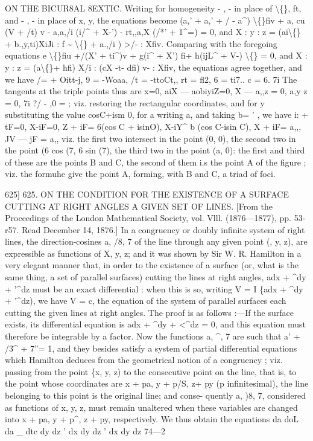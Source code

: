 \documentclass[11pt,a4paper]{book}
\begin{document}
ON THE BICUR8AL 8EXTIC.
Writing
for
homogeneity -
,
-
in
place
of
\textbackslash\{\},
ft,
and
-
,
-
in
place
of
x,
y,
the
equations become
(a,' + a,' + \guillemotleft{}/ - a\textasciicircum{}) \textbackslash\{\}fiv + a, cu (V + /t\guillemotright{}) v - a,a,/i (i/\textasciicircum{} + X-') - rt,,a,X (/*' +
1\textasciicircum{}=) = 0,
and
X
: y
: z = (ai\textbackslash\{\} + b.,y,ti)XiJi
:
f \textasciitilde{} \textbackslash\{\} + a.,/i
)
>/-
:
Xfiv.
Comparing with the foregoing equations
e \textbackslash\{\}fiu +/(X' + ti\textasciicircum{})v + g(i\textasciicircum{} + X') fi+ h(ijL\textasciicircum{} + V-) \textbackslash\{\} = 0,
and
X
: y
: z = (a\textbackslash\{\}+ hfi) X/i
: (cX
-t- dfi) v-
:
Xfiv,
the equations agree together, and we
have
/= + Oitt-j,
9 = -Woaa,
/t = -ttoCt,,
rt =
fl2,
6 =
ti7..
c =
6.
7i
The tangents at the
triple points thus are
x=0,
aiX --- aobiyiZ=0,
X --- a,,z = 0,
a,y
z = 0,
7i
?/ - \guillemotleft{},0 =
;
viz. restoring
the rectangular coordinates, and
for y
substituting the
value cosC+ism 0,
for
a\guillemotleft{} writing
a, and taking b=
'
, we have
i: + tF=0,
X-iF=0,
Z + iF= 6(cos C + isinO),
X-iY\textasciicircum{} b (cos C-isin C),
X + iF= a,,,
JV --- jF = a,,
viz.
the
first two
intersect
in
the
point
(0,
0),
the
second
two
in
the
point
(6 cos (7,
6 sin (7),
the
third
two
in
the
point
(a,
0):
the
first
and
third
of these
are
the points
B
and
C,
the
second
of
them
i.s
the
point A
of
the
figure
;
viz.
the
formuhe
give
the point A, forming, with B and
C, a
triad of
foci.

625]
625.
ON
THE
CONDITION
FOR THE
EXISTENCE
OF A SURFACE
CUTTING AT RIGHT ANGLES A GIVEN SET OF LINES.
[From
the Proceedings of the London Mathematical
Society,
vol.
Vlll. (1876---1877),
pp. 53-r57.
Read December
14,
1876.]
In
a
congruency
or
doubly
infinite
system
of
right
lines,
the
direction-cosines
a,
/8,
7
of
the
line
through
any
given
point
(\guillemotleft{},
y,
z),
are
expressible
as
functions
of
X,
y,
z;
and
it
was
shown
by
Sir W.
R.
Hamilton
in
a
very
elegant
manner
that,
in
order
to
the
existence
of
a
surface
(or,
what
is
the
same
thing,
a
set
of
parallel
surfaces)
cutting
the
lines
at
right
angles,
adx + \textasciicircum{}dy + '\textasciicircum{}dz
must
be
an exact
differential
:
when
this
is
so,
writing
V =
I \{adx + \textasciicircum{}dy + '\textasciicircum{}dz),
we
have
V = c,
the
equation of the system
of parallel surfaces each
cutting the given
lines
at right
angles.
The
proof
is
as
follows
:---If
the
surface
exists,
its
differential
equation
is
adx + \textasciicircum{}dy + <\textasciicircum{}dz = 0,
and
this
equation
must
therefore
be
integrable
by
a
factor.
Now
the
functions
a,
\textasciicircum{},
7
are
such
that
a' + /3\textasciicircum{} + 7''= 1,
and
they
besides
satisfy
a
system
of
partial
differential
equations
which
Hamilton
deduces
from
the
geometrical
notion
of
a
congruency
;
viz.
passing
from
the
point
\{x,
y,
z)
to
the
consecutive
point
on
the
line,
that
is,
to
the
point
whose
coordinates
are
x + pa,
y + p/S, z+ py
(p
infinitesimal),
the
line
belonging
to
this
point
is
the
original
line;
and
conse-
quently
a,
)8,
7, considered
as
functions
of
x,
y,
z,
must
remain
unaltered
when
these
variables
are
changed
into
x + pa,
y + p\textasciicircum{},
z + py,
respectively.
We
thus
obtain
the
equations
da
doL
da \_
dtc
dy
dz
'
dx
dy
dz
'
dx
dy
dz
74---2
\end{document}

